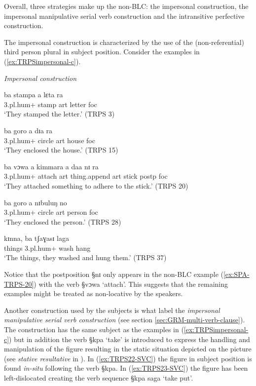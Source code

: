 Overall, three strategies make up the non-BLC: the impersonal construction, the
impersonal manipulative serial verb construction and the intransitive perfective
construction.
 
The impersonal construction is  characterized by the use of the
(non-referential)
third person plural  in subject position. Consider the
examples in (\ref{ex:TRPSimpersonal-c}).

\begin{exe}
\ex\label{ex:TRPSimpersonal-c}\textit{Impersonal construction}

\begin{xlist}
\ex\label{ex:}
\gll ba stampa a lɛta ra\\
 {\sc 3.pl.hum+} stamp {\sc art} letter {\sc foc}\\
\glt `They stamped the letter.' (TRPS 3)


\ex\label{ex:}
\gll ba goro a dɪa ra\\
{\sc 3.pl.hum+}  circle {\sc art} house {\sc foc}\\
\glt `They enclosed the house.' (TRPS 15)


\ex\label{ex:SPA-TRPS-20}
\gll ba vɔwa a kimmara a daa nɪ ra\\
{\sc 3.pl.hum+} attach {\sc art} {\sc thing}.append {\sc art} stick  {\sc
postp}
{\sc foc} \\
\glt `They attached something to adhere to the stick.' (TRPS 20)


\ex\label{ex:}
\gll ba goro a nɪbuluŋ no\\
{\sc 3.pl.hum+} circle {\sc art} person {\sc foc} \\
\glt `They enclosed the person.' (TRPS 28)


\ex\label{ex:}
\gll kɪnna, ba tʃaɣasɪ laga\\
things {\sc 3.pl.hum+} wash hang \\
\glt `The things,  they washed and hung them.' (TRPS 37)
\end{xlist}

\end{exe}

Notice that the postposition {\S nɪ} only appears  in the non-BLC example
(\ref{ex:SPA-TRPS-20}) with the verb {\S vɔwa} `attach'. This suggests that
the remaining examples might be treated as non-locative by the speakers.

Another construction used by the subjects is what \citet[378]{Amek06} label the
{\it impersonal manipulative serial verb construction} (see section
\ref{sec:GRM-multi-verb-clause}). The construction has
the same subject as the examples in (\ref{ex:TRPSimpersonal-c}) but in addition
the verb {\S kpa} `take' is introduced to express the handling and manipulation
of the figure resulting in the static situation depicted on the picture (see
{\it stative resultative} in \citet[516]{Levi06}). In (\ref{ex:TRPS22-SVC}) the
figure in subject position is found {\it in-situ} following the verb {\S kpa}.
In 
(\ref{ex:TRPS23-SVC}) the figure has been left-dislocated creating the verb
sequence {\S kpa saga} `take put'. 

